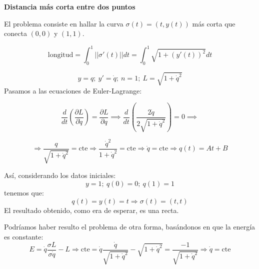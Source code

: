 \begin{example}
\textbf{Distancia más corta entre dos puntos}

El problema consiste en hallar la curva $\sigma (t) = (t, y(t))$ más corta que conecta $(0,0)$ y $(1,1)$.

$$ \text{longitud} = \int_0^1 || \sigma'(t) || dt = \int_0^1 \sqrt{1 + (y'(t))^2} dt$$

$$y = q; \  y' = \dot{q}; \  n=1; \  L = \sqrt{1 + \dot{q}^2}$$
\newpage
Pasamos a las ecuaciones de Euler-Lagrange:

$$\frac{d}{dt}\left(\frac{\partial L}{\partial \dot{q}}\right) = \frac{\partial L}{\partial q} \implies  \frac{d}{dt}\left(\frac{2 \dot{q}}{2 \sqrt{1 + \dot{q}^2}}\right) = 0 \implies$$

$$\Rightarrow \frac{q}{\sqrt{1 + \dot{q}^2}} = \text{cte} \Rightarrow \frac{\dot{q}^2}{1 + \dot{q}^2} = \text{cte} \Rightarrow \dot{q} = \text{cte} \Rightarrow q(t) = At + B $$

Así, considerando los datos iniciales:
\[ y = 1; \  q(0) = 0; \  q(1) = 1\]
tenemos que:
\[q(t) = y(t) = t \Rightarrow \sigma (t) = (t,t)\]
El resultado obtenido, como era de esperar, es una recta.

\begin{obs}
Podríamos haber resulto el problema de otra forma, basándonos en que la energía es constante:
$$E = \dot{q} \frac{\sigma L}{\sigma \dot{q}} - L \Rightarrow \text{cte} = \dot{q} \frac{\dot{q}}{\sqrt{1 + \dot{q}^2}} - \sqrt{1 + \dot{q}^2} = \frac{-1}{\sqrt{1 + \dot{q}^2}} \Rightarrow \dot{q} = \text{cte}$$
\end{obs}

\end{example}

